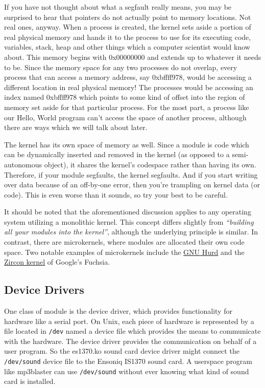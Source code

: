 \documentclass[10pt, oneside]{book}
\begin{document}
If you have not thought about what a segfault really means, you may be surprised to hear that pointers do not actually point to memory locations.
Not real ones, anyway.
When a process is created, the kernel sets aside a portion of real physical memory and hands it to the process to use for its executing code, variables, stack, heap and other things which a computer scientist would know about.
This memory begins with 0x00000000 and extends up to whatever it needs to be.
Since the memory space for any two processes do not overlap, every process that can access a memory address, say 0xbffff978, would be accessing a different location in real physical memory! The processes would be accessing an index named 0xbffff978 which points to some kind of offset into the region of memory set aside for that particular process.
For the most part, a process like our Hello, World program can't access the space of another process, although there are ways which we will talk about later.

The kernel has its own space of memory as well. Since a module is code which can be dynamically inserted and removed in the kernel (as opposed to a semi-autonomous object), it shares the kernel's codespace rather than having its own.
Therefore, if your module segfaults, the kernel segfaults.
And if you start writing over data because of an off-by-one error, then you're trampling on kernel data (or code).
This is even worse than it sounds, so try your best to be careful.

It should be noted that the aforementioned discussion applies to any operating system utilizing a monolithic kernel.
This concept differs slightly from \emph{``building all your modules into the kernel''},
although the underlying principle is similar.
In contrast, there are microkernels, where modules are allocated their own code space.
Two notable examples of microkernels include the \href{https://www.gnu.org/software/hurd/}{GNU Hurd} and the \href{https://fuchsia.dev/fuchsia-src/concepts/kernel}{Zircon kernel} of Google's Fuchsia.

\subsection{Device Drivers}
\label{sec:device_drivers}
One class of module is the device driver, which provides functionality for hardware like a serial port.
On Unix, each piece of hardware is represented by a file located in \verb|/dev| named a device file which provides the means to communicate with the hardware.
The device driver provides the communication on behalf of a user program.
So the es1370.ko sound card device driver might connect the \verb|/dev/sound| device file to the Ensoniq IS1370 sound card.
A userspace program like mp3blaster can use \verb|/dev/sound| without ever knowing what kind of sound card is installed.
\end{document}
